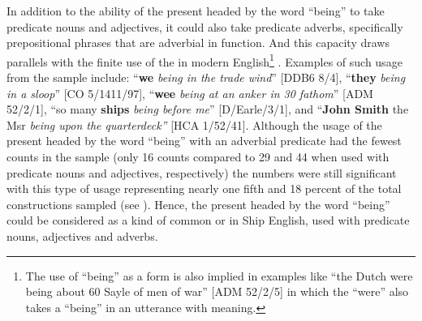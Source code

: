 In addition to the ability of the present  headed by the word “being” to take predicate nouns and adjectives, it could also take predicate adverbs, specifically prepositional phrases that are adverbial in function. And this capacity draws parallels with the finite use of the  in modern English\footnote{The use of “being” as a  form is also implied in examples like “the Dutch were being about 60 Sayle of men of war” [ADM 52/2/5] in which the  “were” also takes a  “being” in an utterance with  meaning.} . Examples of such usage from the sample include: “\textbf{we} \textit{being in the trade wind}” [DDB6 8/4], “\textbf{they} \textit{being in a sloop}” [CO 5/1411/97], “\textbf{wee} \textit{being at an anker in 30 fathom}” [ADM 52/2/1], “so many \textbf{ships} \textit{being before me}” [D/Earle/3/1], and “\textbf{John Smith} the Msr \textit{being upon the quarterdeck”} [HCA 1/52/41]. Although the usage of the present  headed by the word “being” with an adverbial predicate had the fewest counts in the sample (only 16 counts compared to 29 and 44 when used with predicate nouns and adjectives, respectively) the numbers were still significant with this type of usage representing nearly one fifth and 18 percent of the total constructions sampled (see ). Hence, the present  headed by the word “being” could be considered as a kind of common  or  in Ship English, used with predicate nouns, adjectives and adverbs. 

